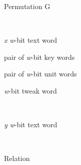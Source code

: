 \documentclass[a4paper,oneside,english]{amsart}
\numberwithin{equation}{section}
\numberwithin{figure}{section}
\newenvironment{lyxlist}[1]
{\begin{list}{}
{\settowidth{\labelwidth}{#1}
 \setlength{\leftmargin}{\labelwidth}
 \addtolength{\leftmargin}{\labelsep}
 \renewcommand{\makelabel}[1]{##1\hfil}}}
{\end{list}}
\newenvironment{lyxcode}
{\par\begin{list}{}{
\setlength{\rightmargin}{\leftmargin}
\setlength{\listparindent}{0pt}\raggedright
\setlength{\itemsep}{0pt}
\setlength{\parsep}{0pt}
\normalfont\ttfamily}\item[]}
{\end{list}}
\begin{document}
\begin{algorithm}
\caption{\label{alg:Permutation-G}Permutation G}

\begin{description}
\item [{Input}]~

\begin{lyxlist}{00.00.0000}
\item [{\emph{x}}] \emph{w}-bit text word
\item [{}] pair of \emph{w}-bit key words
\item [{}] pair of \emph{w}-bit unit words
\item [{}] \emph{w}-bit tweak word
\end{lyxlist}
\item [{Output}]~

\begin{lyxlist}{00.00.0000}
\item [{\emph{y}}] \emph{w}-bit text word
\end{lyxlist}
\item [{Pseudo-code}]~\end{description}
\begin{lyxcode}










\end{lyxcode}
\begin{description}
\item [{Relation}]~\end{description}
\begin{lyxcode}
\end{lyxcode}
\end{algorithm}
\end{document}
